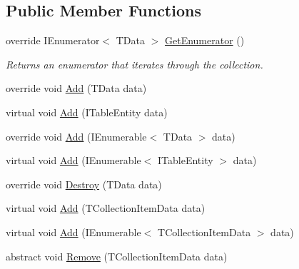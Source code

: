 \subsection*{Public Member Functions}
\begin{DoxyCompactItemize}
\item 
override I\+Enumerator$<$ T\+Data $>$ \hyperlink{classCqrs_1_1Azure_1_1BlobStorage_1_1TableStorageStore_ac3e684b894e739f8936e537806952c49_ac3e684b894e739f8936e537806952c49}{Get\+Enumerator} ()
\begin{DoxyCompactList}\small\item\em Returns an enumerator that iterates through the collection. \end{DoxyCompactList}\item 
override void \hyperlink{classCqrs_1_1Azure_1_1BlobStorage_1_1TableStorageStore_ad9becfb4b149c645450deba342696e54_ad9becfb4b149c645450deba342696e54}{Add} (T\+Data data)
\item 
virtual void \hyperlink{classCqrs_1_1Azure_1_1BlobStorage_1_1TableStorageStore_aa8e6b41c32dd8f81d5ff852693e7979d_aa8e6b41c32dd8f81d5ff852693e7979d}{Add} (I\+Table\+Entity data)
\item 
override void \hyperlink{classCqrs_1_1Azure_1_1BlobStorage_1_1TableStorageStore_a2b10c02a19150d5a68e6dcb4810ea8a1_a2b10c02a19150d5a68e6dcb4810ea8a1}{Add} (I\+Enumerable$<$ T\+Data $>$ data)
\item 
virtual void \hyperlink{classCqrs_1_1Azure_1_1BlobStorage_1_1TableStorageStore_a120c6fbb947cf4d37f60335df0182008_a120c6fbb947cf4d37f60335df0182008}{Add} (I\+Enumerable$<$ I\+Table\+Entity $>$ data)
\item 
override void \hyperlink{classCqrs_1_1Azure_1_1BlobStorage_1_1TableStorageStore_a1ad02e710a3fe1d794d99db332c351dc_a1ad02e710a3fe1d794d99db332c351dc}{Destroy} (T\+Data data)
\item 
virtual void \hyperlink{classCqrs_1_1Azure_1_1BlobStorage_1_1TableStorageStore_ae48083bacf8a74175122e7618ae2a605_ae48083bacf8a74175122e7618ae2a605}{Add} (T\+Collection\+Item\+Data data)
\item 
virtual void \hyperlink{classCqrs_1_1Azure_1_1BlobStorage_1_1TableStorageStore_a79dc78a910107ede003b145a2da25897_a79dc78a910107ede003b145a2da25897}{Add} (I\+Enumerable$<$ T\+Collection\+Item\+Data $>$ data)
\item 
abstract void \hyperlink{classCqrs_1_1Azure_1_1BlobStorage_1_1TableStorageStore_a8e013351f5dcccd1915bf7ed6c58317e_a8e013351f5dcccd1915bf7ed6c58317e}{Remove} (T\+Collection\+Item\+Data data)

\end{DoxyCompactItemize}
